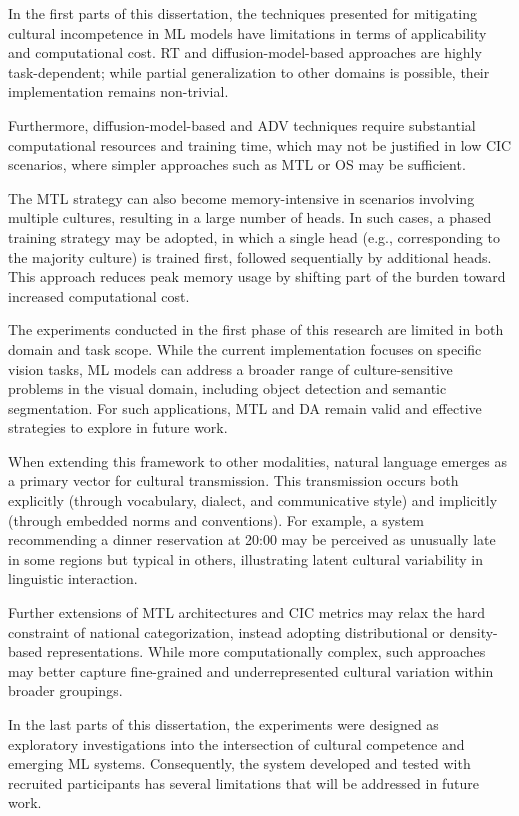 In the first parts of this dissertation,  the techniques presented for mitigating cultural incompetence in ML models have limitations in terms of applicability and computational cost. RT and diffusion-model-based approaches are highly task-dependent; while partial generalization to other domains is possible, their implementation remains non-trivial.

Furthermore, diffusion-model-based and ADV techniques require substantial computational resources and training time, which may not be justified in low CIC scenarios, where simpler approaches such as MTL or OS may be sufficient.

The MTL strategy can also become memory-intensive in scenarios involving multiple cultures, resulting in a large number of heads. In such cases, a phased training strategy may be adopted, in which a single head (e.g., corresponding to the majority culture) is trained first, followed sequentially by additional heads. This approach reduces peak memory usage by shifting part of the burden toward increased computational cost.

The experiments conducted in the first phase of this research are limited in both domain and task scope. While the current implementation focuses on specific vision tasks, ML models can address a broader range of culture-sensitive problems in the visual domain, including object detection and semantic segmentation. For such applications, MTL and DA remain valid and effective strategies to explore in future work.

When extending this framework to other modalities, natural language emerges as a primary vector for cultural transmission. This transmission occurs both explicitly (through vocabulary, dialect, and communicative style) and implicitly (through embedded norms and conventions). For example, a system recommending a dinner reservation at 20:00 may be perceived as unusually late in some regions but typical in others, illustrating latent cultural variability in linguistic interaction.

Further extensions of MTL architectures and CIC metrics may relax the hard constraint of national categorization, instead adopting distributional or density-based representations. While more computationally complex, such approaches may better capture fine-grained and underrepresented cultural variation within broader groupings.

In the last parts of this dissertation, the experiments were designed as exploratory investigations into the intersection of cultural competence and emerging ML systems.
Consequently, the system developed and tested with recruited participants has several limitations that will be addressed in future work.

